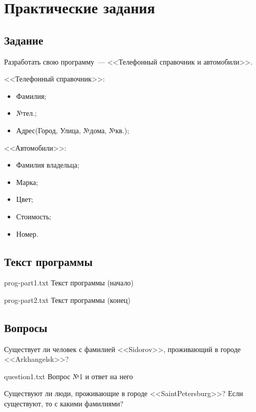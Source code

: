 \chapter{Практические задания}

\section{Задание}

Разработать свою программу~--- <<Телефонный справочник и автомобили>>. 

<<Телефонный справочник>>:
\begin{itemize}[label*=--]
	\item Фамилия;
	\item №тел.;
	\item Адрес(Город, Улица, №дома, №кв.);
\end{itemize}

<<Автомобили>>:
\begin{itemize}[label*=--]
	\item Фамилия владельца;
	\item Марка;
	\item Цвет;
	\item Стоимость;
	\item Номер.
\end{itemize}

\section{Текст программы}

{prog-part1.txt} %
{Текст программы (начало)} %

{prog-part2.txt} %
{Текст программы (конец)} %

\section{Вопросы}

Существует ли человек с фамилией <<Sidorov>>, проживающий в городе <<Arkhangelsk>>?

{question1.txt} %
{Вопрос №1 и ответ на него} %

Существуют ли люди, проживающие в городе <<SaintPetersburg>>? Если существуют, то с какими фамилиями?

